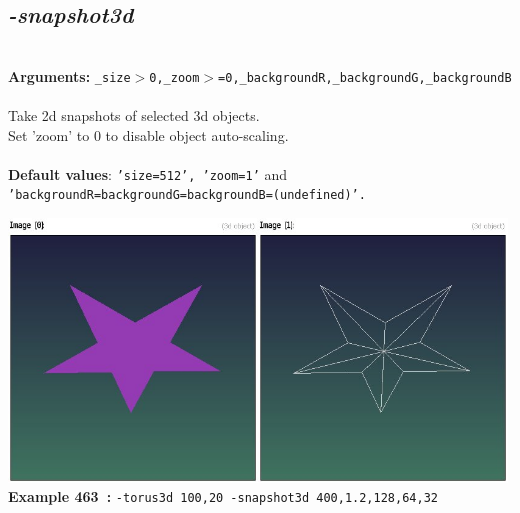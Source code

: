 \documentclass[a4paper,11pt,twoside]{book}
\begin{document}
\subsection{\emph{-snapshot3d} }\vspace*{-0.5em}
~\\\textbf{Arguments: } 
{\small \texttt{\_size$>$0,\_zoom$>$=0,\_backgroundR,\_backgroundG,\_backgroundB}}\\~\\
Take 2d snapshots of selected 3d objects.
~\\Set 'zoom' to 0 to disable object auto-scaling.
~\\~\\\textbf{Default values}: {\small \texttt{'size=512', 'zoom=1'} and \texttt{'backgroundR=backgroundG=backgroundB=(undefined)'.}}
\begin{center}\includegraphics[keepaspectratio=true,height=7cm,width=\textwidth]{img/gmic_def463.jpg}\\
{\footnotesize \textbf{Example 463~:} \texttt{-torus3d 100,20 -snapshot3d 400,1.2,128,64,32}}
\end{center}
\end{document}

